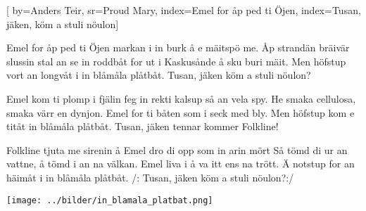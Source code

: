 

[ 		%
	by={Anders Teir},					%
	sr={Proud Mary},					%
	index={Emel for åp ped ti Öjen}, 						%
	index={Tusan, jäken, köm a stuli nöulon}]						%
	

\beginverse*						%
Emel for åp ped ti Öjen
markan i in burk å e mäitspö me.
Åp strandän bräivär slussin
stal an se in roddbåt
for ut i Kaskusånde å sku buri mäit.
Men höfstup vort an longvåt
i in blåmåla plåtbåt.
Tusan, jäken
köm a stuli nöulon?
\endverse							%

\beginverse*						%
Emel kom ti plomp i fjälin
feg in rekti kalsup så an vela spy.
He smaka cellulosa,
smaka värr en dynjon.
Emel for ti båten som i seck med bly.
Men höfstup kom e titåt
in blåmåla plåtbåt.
Tusan, jäken
tennar kommer Folkline!
\endverse							%

\beginverse*						%
Folkline tjuta me sirenin
å Emel dro di opp som in arin mört
Så tömd di ur an vattne,
å tömd i an na välkan.
Emel liva i å va itt ens na trött.
Ä notstup for an häimåt
i in blåmåla plåtbåt.
/: Tusan, jäken
köm a stuli nöulon?:/
\endverse							%
\endsong							%

\begin{intersong}
\texttt{[image: ../bilder/in\_blamala\_platbat.png]} 
\end{intersong}
